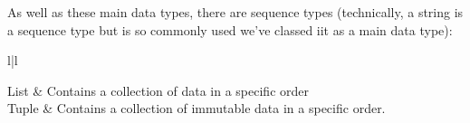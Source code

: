 \documentclass{book}
\begin{document}
As well as these main data types, there are sequence types (technically, a string is a sequence type but is so commonly used we've classed iit as a main data type):

\begin{table}{l|l}

List & Contains a collection of data in a specific order\\\hline
Tuple & Contains a collection of immutable data in a specific order.\\

\end{table}
\end{document}
